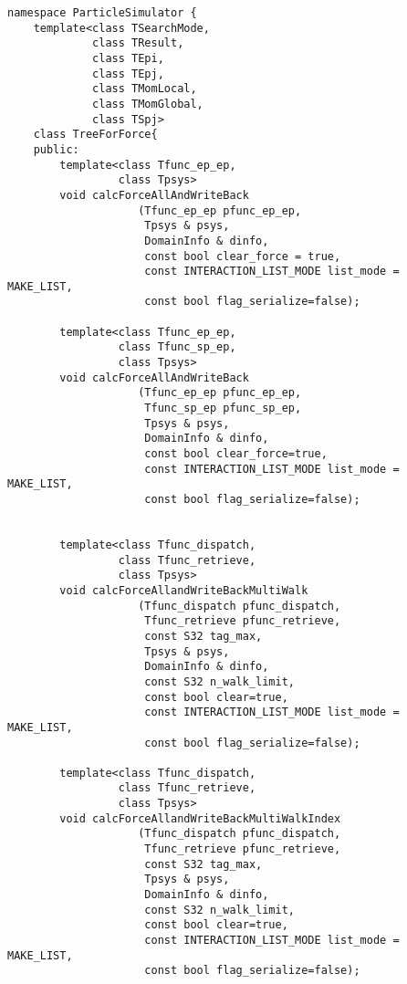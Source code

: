 \begin{lstlisting}[caption=TreeForForce1]
namespace ParticleSimulator {
    template<class TSearchMode,
             class TResult,
             class TEpi,
             class TEpj,
             class TMomLocal,
             class TMomGlobal,
             class TSpj>
    class TreeForForce{
    public:
        template<class Tfunc_ep_ep,
                 class Tpsys>
        void calcForceAllAndWriteBack
                    (Tfunc_ep_ep pfunc_ep_ep,
                     Tpsys & psys,
                     DomainInfo & dinfo,
                     const bool clear_force = true,
                     const INTERACTION_LIST_MODE list_mode = MAKE_LIST,
                     const bool flag_serialize=false);
                     
        template<class Tfunc_ep_ep,
                 class Tfunc_sp_ep,
                 class Tpsys>
        void calcForceAllAndWriteBack
                    (Tfunc_ep_ep pfunc_ep_ep,
                     Tfunc_sp_ep pfunc_sp_ep,  
                     Tpsys & psys,
                     DomainInfo & dinfo,
                     const bool clear_force=true,
                     const INTERACTION_LIST_MODE list_mode = MAKE_LIST,
                     const bool flag_serialize=false);

                     
        template<class Tfunc_dispatch,
                 class Tfunc_retrieve,
                 class Tpsys>
        void calcForceAllandWriteBackMultiWalk
                    (Tfunc_dispatch pfunc_dispatch,
                     Tfunc_retrieve pfunc_retrieve,
                     const S32 tag_max,
                     Tpsys & psys,
                     DomainInfo & dinfo,
                     const S32 n_walk_limit, 
                     const bool clear=true,
                     const INTERACTION_LIST_MODE list_mode = MAKE_LIST,
                     const bool flag_serialize=false); 
     
        template<class Tfunc_dispatch,
                 class Tfunc_retrieve,
                 class Tpsys>
        void calcForceAllandWriteBackMultiWalkIndex
                    (Tfunc_dispatch pfunc_dispatch,
                     Tfunc_retrieve pfunc_retrieve,
                     const S32 tag_max,
                     Tpsys & psys,
                     DomainInfo & dinfo,
                     const S32 n_walk_limit,
                     const bool clear=true,
                     const INTERACTION_LIST_MODE list_mode = MAKE_LIST,
                     const bool flag_serialize=false);


\end{lstlisting}
